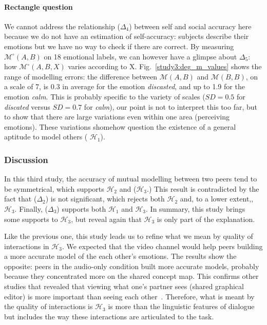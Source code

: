 \documentclass[natbib]{svjour3}
\newcommand{\gmodel}[2]{{$\mathcal{M}(#1, #2)$}}
\newcommand{\Model}[3]{{$\mathcal{M}^{\circ}(#1, #2, #3)$}}
\newcommand{\gModel}[2]{{$\mathcal{M}^{\circ}(#1, #2)$}}
\begin{document}
\paragraph{Rectangle question} We cannot address the relationship ($\Delta_4$)
between self and social accuracy here because we do not have an estimation of
self-accuracy: subjects describe their emotions but we have no way to check if
there are correct. By measuring \gModel{A}{B} on  18 emotional labels,
we can however have a glimpse about $\Delta_5$: how \Model{A}{B}{X} varies
according to X.  Fig.~\ref{study3:deg_m_values} shows the range of modelling
errors: the difference between \gmodel{A}{B} and \gmodel{B}{B}, on a scale of 7,
is 0.3 in average for the emotion \emph{discasted}, and up to 1.9 for the
emotion \emph{calm}. This is probably specific to the variety of scales  ($SD=
0.5$ for \emph{discated} versus $SD=0.7$ for \emph{calm}), our point is not to
interpret this too far, but to show that there are large variations even within one
area  (perceiving emotions). These variations shomehow question the existence of
a general aptitude to model others ( $\mathcal{H}_{1}$).


\subsubsection*{Discussion} 

In this third study, the accuracy of mutual modelling  between two peers tend to
be symmetrical, which  supports $\mathcal{H}_{2}$ and ($\mathcal{H}_{3}$.)  This
result is contradicted by the fact that ($\Delta_2$) is not significant, which
rejects both $\mathcal{H}_{2}$ and, to a lower extent,,  $\mathcal{H}_{3}$.
Finally,  ($\Delta_3$) supports both  $\mathcal{H}_{1}$ and  $\mathcal{H}_{3}$.
In summary, this study brings some supports to  $\mathcal{H}_{3}$, but reveal
again that $\mathcal{H}_{3}$ is only part of the explanation.

Like the previous one, this study leads us to refine what we mean by quality of
interactions in $\mathcal{H}_{3}$. We  expected that the video channel would
help peers building a more accurate model of the each other's emotions.  The
results show the opposite: peers in the audio-only condition built more accurate
models, probably because they concentrated more on the shared concept map. This
confirms other studies that revealed that viewing what one's partner sees
(shared graphical editor) is more important than seeing each
other~\citep{gaver1993one,anderson1997impact}. Therefore, what is meant by the
quality of interactions is $\mathcal{H}_{3}$ is more than the linguistic features
of dialogue but includes the way these interactions are articulated to the task.
\end{document}
